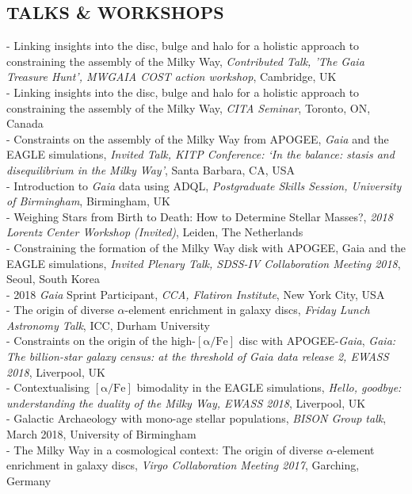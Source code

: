 \documentclass[margin]{res}
\begin{document}
\begin{resume}
\section{TALKS \& WORKSHOPS}
- Linking insights into the disc, bulge and halo for a holistic approach to constraining the assembly of the Milky Way, \emph{Contributed Talk, 'The Gaia Treasure Hunt', MWGAIA COST action workshop}, Cambridge, UK\\
- Linking insights into the disc, bulge and halo for a holistic approach to constraining the assembly of the Milky Way, \emph{CITA Seminar}, Toronto, ON, Canada\\ 
- Constraints on the assembly of the Milky Way from APOGEE, \emph{Gaia} and the EAGLE simulations, \emph{Invited Talk, KITP Conference: `In the balance: stasis and disequilibrium in the Milky Way'}, Santa Barbara, CA, USA\\ 
- Introduction to \emph{Gaia} data using ADQL, \emph{Postgraduate Skills Session, University of Birmingham}, Birmingham, UK\\
- Weighing Stars from Birth to Death: How to Determine Stellar Masses?, \emph{2018 Lorentz Center Workshop (Invited)}, Leiden, The Netherlands\\
- Constraining the formation of the Milky Way disk with APOGEE, Gaia and the EAGLE simulations, \emph{Invited Plenary Talk, SDSS-IV Collaboration Meeting 2018}, Seoul, South Korea\\
- 2018 \emph{Gaia} Sprint Participant, \emph{CCA, Flatiron Institute}, New York City, USA\\
- The origin of diverse $\alpha$-element enrichment in galaxy discs, \emph{Friday Lunch Astronomy Talk}, ICC, Durham University\\
- Constraints on the origin of the high-$\mathrm{[\alpha/Fe]}$ disc with APOGEE-\emph{Gaia}, \emph{Gaia: The billion-star galaxy census: at the threshold of Gaia data release 2, EWASS 2018}, Liverpool, UK \\
- Contextualising $\mathrm{[\alpha/Fe]}$ bimodality in the EAGLE simulations, \emph{Hello, goodbye: understanding the duality of the Milky Way, EWASS 2018}, Liverpool, UK \\
- Galactic Archaeology with mono-age stellar populations, \emph{BISON Group talk}, March 2018, University of Birmingham\\
- The Milky Way in a cosmological context: The origin of diverse $\alpha$-element enrichment in galaxy discs, \emph{Virgo Collaboration Meeting 2017}, Garching, Germany\\

\end{resume}
\end{document}
